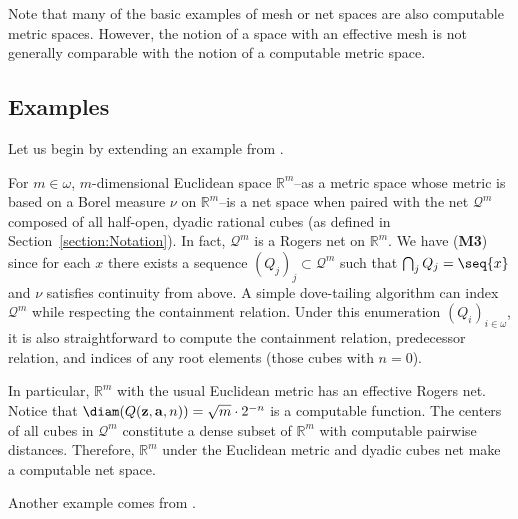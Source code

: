 Note that many of the basic examples of mesh or net spaces are also computable metric spaces. However, the notion of a space with an effective mesh is not generally comparable with the notion of a computable metric space. 

\subsection{Examples}

Let us begin by extending an example from \cite{May14}. 
\begin{example}
    \label{example:euclidean_has_dyadic_net}
    For $m \in \omega$, $m$-dimensional Euclidean space $\mathbb{R}^m$--as a metric space whose metric is based on a Borel measure $\nu$ on $\mathbb{R}^m$--is a net space when paired with the net $\mathcal{Q}^m$ composed of all half-open, dyadic rational cubes (as defined in Section~\ref{section:Notation}).
    In fact, $\mathcal{Q}^m$ is a Rogers net on $\mathbb{R}^m$. We have (\textbf{M3}) since for each $x$ there exists a sequence $(Q_j)_j \subset \mathcal{Q}^m$ such that $\bigcap_j Q_j = \seq{x}$ and $\nu$ satisfies continuity from above. A simple dove-tailing algorithm can index $\mathcal{Q}^m$ while respecting the containment relation. Under this enumeration $(Q_i)_{i \in \omega}$, it is also straightforward to compute the containment relation, predecessor relation, and indices of any root elements (those cubes with $n = 0$). 
    
    In particular, $\mathbb{R}^m$ with the usual Euclidean metric has an effective Rogers net. Notice that $\diam(Q(\mathbf{z}, \mathbf{a}, n)) = \sqrt{m} \cdot 2^{-n}$ is a computable function. The centers of all cubes in $\mathcal{Q}^m$ constitute a dense subset of $\mathbb{R}^m$ with computable pairwise distances. Therefore, $\mathbb{R}^m$ under the Euclidean metric and dyadic cubes net make a computable net space.
\end{example}

Another example comes from \cite{Rog70}.

